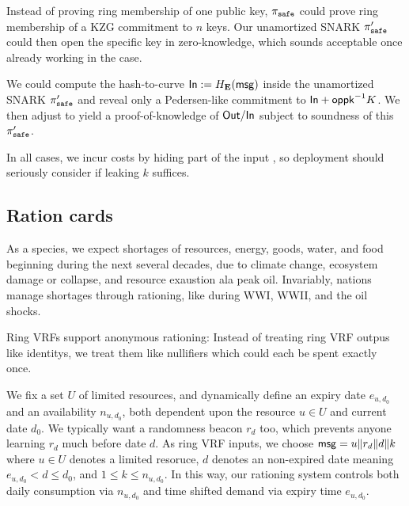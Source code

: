 Instead of proving ring membership of one public key,
$\pi_{\mathtt{safe}}$ could prove ring membership of a KZG commitment to $n$ keys.
Our unamortized SNARK $\pi_{\mathtt{safe}}'$ could then open the specific key in
zero-knowledge, which sounds acceptable once already working in the \pisafe case.

We could compute the hash-to-curve ${\mathsf{In}} := H_{{\mathbf{E}}}(\mathsf{msg})$ inside the
unamortized SNARK $\pi_{\mathtt{safe}}'$ and reveal only a Pedersen-like commitment
to ${\mathsf{In}} + \mathsf{oppk}^{-1} K$.  We then adjust \PedVRF to yield
a proof-of-knowledge of ${\mathsf{Out}}/{\mathsf{In}}$ subject to soundness of this
$\pi_{\mathtt{safe}}'$.

In all cases, we incur costs by hiding part of the input \msg, so
deployment should seriously consider if leaking $k$ suffices.



\subsection{Ration cards}

As a species, we expect shortages of resources, energy, goods, water,
and food beginning during the next several decades, due to climate change,
ecosystem damage or collapse, and resource exaustion ala peak oil. 
Invariably, nations manage shortages through rationing, like during
WWI, WWII, and the oil shocks.  

Ring VRFs support anonymous rationing:
Instead of treating ring VRF outpus like identitys,
we treat them like nullifiers which could each be spent exactly once.

\def\expiry{e}
We fix a set $U$ of limited resources, and dynamically define
an expiry date $\expiry_{u,d_0}$ and an availability $n_{u,d_0}$, 
both dependent upon the resource $u \in U$ and current date $d_0$.
We typically want a randomness beacon $r_d$ too, which prevents
anyone learning $r_d$ much before date $d$. 
As ring VRF inputs, we choose
 $\mathsf{msg} = u \| r_d \| d \| k$
where $u \in U$ denotes a limited resoruce,
 $d$ denotes an non-expired date meaning $\expiry_{u,d_0} < d \le d_0$,
 and $1 \le k \le n_{u,d_0}$.
In this way, our rationing system controls both daily consumption
via $n_{u,d_0}$ and time shifted demand via expiry time $\expiry_{u,d_0}$.

